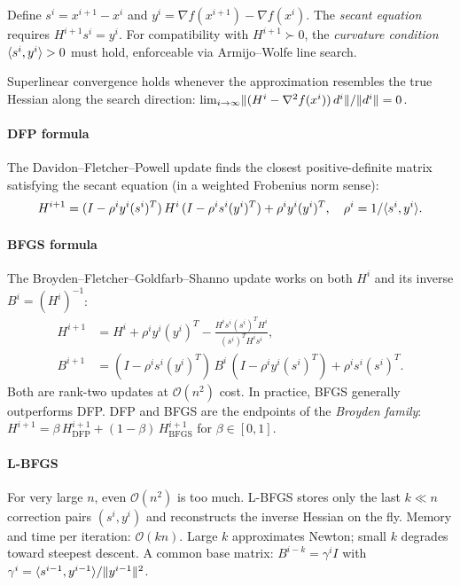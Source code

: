 \begin{definition}\label{def:secant}
	Define $s^i = x^{i+1} - x^i$ and $y^i = \nabla f(x^{i+1}) - \nabla f(x^i)$.
	The \emph{secant equation} requires $H^{i+1} s^i = y^i$.
	For compatibility with $H^{i+1} \succ 0$, the \emph{curvature condition} $\langle s^i, y^i\rangle > 0$ must hold, enforceable via Armijo--Wolfe line search.
\end{definition}

Superlinear convergence holds whenever the approximation resembles the true Hessian along the search direction: $\lim_{i \to \infty} \lVert(H^i - \nabla^2 f(x^i))\, d^i\rVert / \lVert d^i\rVert = 0$.

\paragraph{DFP formula}

The Davidon--Fletcher--Powell update finds the closest positive-definite matrix satisfying the secant equation (in a weighted Frobenius norm sense):
\begin{equation}\label{eq:dfp-update}
	H^{i+1} = (I - \rho^i y^i (s^i)^T)\, H^i\, (I - \rho^i s^i (y^i)^T) + \rho^i y^i (y^i)^T,
	\quad \rho^i = 1/\langle s^i, y^i\rangle.
\end{equation}

\paragraph{BFGS formula}

The Broyden--Fletcher--Goldfarb--Shanno update works on both $H^i$ and its inverse $B^i = (H^i)^{-1}$:
\begin{align*}
	H^{i+1} &= H^i + \rho^i y^i (y^i)^T - \frac{H^i s^i (s^i)^T H^i}{(s^i)^T H^i s^i}, \\
	B^{i+1} &= (I - \rho^i s^i (y^i)^T)\, B^i\, (I - \rho^i y^i (s^i)^T) + \rho^i s^i (s^i)^T.
\end{align*}
Both are rank-two updates at $\mathcal{O}(n^2)$ cost.
In practice, BFGS generally outperforms DFP.
DFP and BFGS are the endpoints of the \emph{Broyden family}: $H^{i+1} = \beta\, H^{i+1}_{\mathrm{DFP}} + (1 - \beta)\, H^{i+1}_{\mathrm{BFGS}}$ for $\beta \in [0, 1]$.

\paragraph{L-BFGS}

For very large $n$, even $\mathcal{O}(n^2)$ is too much.
L-BFGS stores only the last $k \ll n$ correction pairs $(s^i, y^i)$ and reconstructs the inverse Hessian on the fly.
Memory and time per iteration: $\mathcal{O}(kn)$.
Large $k$ approximates Newton; small $k$ degrades toward steepest descent.
A common base matrix: $B^{i-k} = \gamma^i I$ with $\gamma^i = \langle s^{i-1}, y^{i-1}\rangle / \lVert y^{i-1}\rVert^2$.


